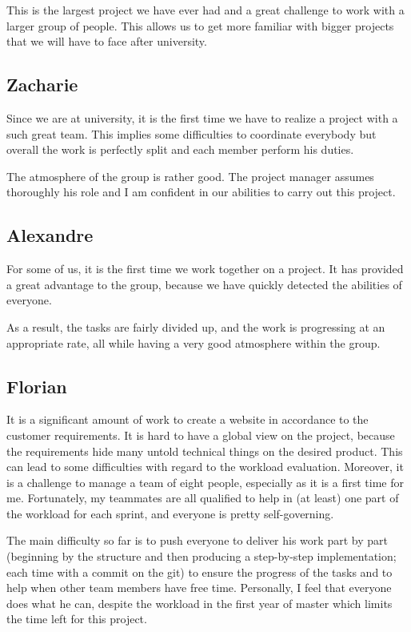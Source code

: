 This is the largest project we have ever had and a great challenge to work
with a larger group of people. This allows us to get more familiar with
bigger projects that we will have to face after university.

\subsection{Zacharie}

Since we are at university, it is the first time we have to realize a
project with a such great team. This implies some difficulties to
coordinate everybody but overall the work is perfectly split and each
member perform his duties. \newline

The atmosphere of the group is rather good. The project manager assumes
thoroughly his role and I am confident in our abilities to carry out this
project.

\clearpage
\subsection{Alexandre}

For some of us, it is the first time we work together on a project. It has
provided a great advantage to the group, because we have quickly detected
the abilities of everyone. \newline

As a result, the tasks are fairly divided up, and the work is progressing
at an appropriate rate, all while having a very good atmosphere within the
group.

\subsection{Florian}

It is a significant amount of work to create a website in accordance to the
customer requirements. It is hard to have a global view on the project,
because the requirements hide many untold technical things on the desired
product. This can lead to some difficulties with regard to the workload
evaluation. Moreover, it is a challenge to manage a team of eight people,
especially as it is a first time for me. Fortunately, my
teammates are all qualified to help in (at least) one part of the workload for
each sprint, and everyone is pretty self-governing. \newline

The main difficulty so far is to push everyone to deliver his work part by
part (beginning by the structure and then producing a step-by-step
implementation; each time with a commit on the git) to ensure the progress
of the tasks and to help when other team members have free time.
Personally, I feel that everyone does what he can, despite the workload in
the first year of master which limits the time left for this project.\newline
